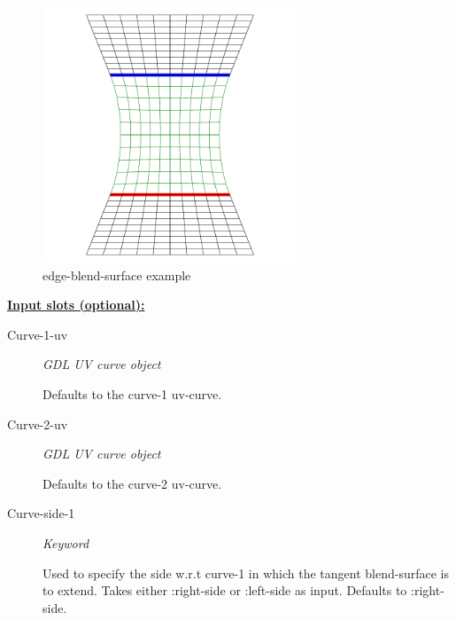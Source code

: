 \documentclass [11pt]{book}
\begin{document}
\begin{itemize}
\begin{figure}
\label{fig:example-code-edge-blend-surface}

\end{figure}

\begin{figure}
\begin{center}
\includegraphics[width=3in,height=3in]{../images/example-edge-blend-surface.pdf}
\end{center}

\caption{edge-blend-surface example}

\label{fig:edge-blend-surface}

\end{figure}





\textbf{
\underline{Input slots (optional):}}

\begin{description}

\item [Curve-1-uv]
\emph{GDL UV curve object}

 Defaults to the curve-1 uv-curve.




\item [Curve-2-uv]
\emph{GDL UV curve object}

 Defaults to the curve-2 uv-curve.




\item [Curve-side-1]
\emph{Keyword}

 Used to specify the side w.r.t curve-1 in which the tangent blend-surface is to extend. Takes either :right-side or :left-side as input. Defaults to :right-side.





\end{description}
\end{itemize}
\end{document}
